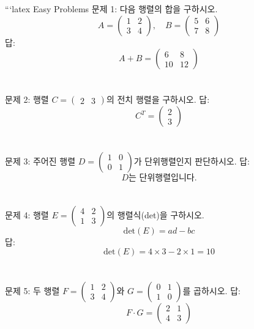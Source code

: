 \documentclass[fleqn]{article}
\begin{document}
      
        ```latex
 Easy Problems
\noindent 문제 1: 다음 행렬의 합을 구하시오.
\[
A = \begin{pmatrix}
1 & 2 \\
3 & 4 
\end{pmatrix}, \quad B = \begin{pmatrix}
5 & 6 \\
7 & 8 
\end{pmatrix}
\]
\noindent 답: \\
\[
A + B = \begin{pmatrix}
6 & 8 \\
10 & 12 
\end{pmatrix}
\] \\\\

\noindent 문제 2: 행렬 \(C = \begin{pmatrix}
2 & 3 
\end{pmatrix}\)의 전치 행렬을 구하시오. \noindent 답: \\
\[
C^T = \begin{pmatrix}
2 \\
3 
\end{pmatrix}
\] \\\\

\noindent 문제 3: 주어진 행렬 \(D = \begin{pmatrix}
1 & 0 \\
0 & 1 
\end{pmatrix}\)가 단위행렬인지 판단하시오. \noindent 답: \\
\[
D \text{는 단위행렬입니다.}
\] \\\\

\noindent 문제 4: 행렬 \(E = \begin{pmatrix}
4 & 2 \\
1 & 3 
\end{pmatrix}\)의 행렬식(det)을 구하시오.
\[
\text{det}(E) = ad - bc
\] \noindent 답: \\
\[
\text{det}(E) = 4 \times 3 - 2 \times 1 = 10
\] \\\\

\noindent 문제 5: 두 행렬 \(F = \begin{pmatrix}
1 & 2 \\
3 & 4 
\end{pmatrix}\)와 \(G = \begin{pmatrix}
0 & 1 \\
1 & 0 
\end{pmatrix}\)를 곱하시오. \noindent 답: \\
\[
F \cdot G = \begin{pmatrix}
2 & 1 \\
4 & 3 
\end{pmatrix}
\] \\\\
\end{document}
